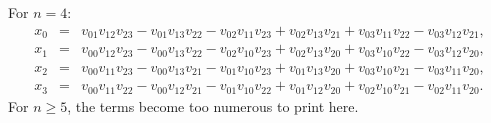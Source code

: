 \documentclass[12pt]{article}
\begin{document}
For $n = 4$:
\begin{eqnarray}
x_{0} &=& 
   v_{01} v_{12} v_{23}
 - v_{01} v_{13} v_{22}
 - v_{02} v_{11} v_{23}
 + v_{02} v_{13} v_{21}
 + v_{03} v_{11} v_{22}
 - v_{03} v_{12} v_{21},\\
x_{1} &=& 
    v_{00} v_{12} v_{23}
  - v_{00} v_{13} v_{22}
 - v_{02} v_{10} v_{23}
 + v_{02} v_{13} v_{20}
  + v_{03} v_{10} v_{22}
  - v_{03} v_{12} v_{20},\\
x_{2} &=& 
v_{00} v_{11} v_{23}
- v_{00} v_{13} v_{21}
  - v_{01} v_{10} v_{23}
  + v_{01} v_{13} v_{20}
  + v_{03} v_{10} v_{21}
  - v_{03} v_{11} v_{20},\\
x_{3} &=& 
   v_{00} v_{11} v_{22}
 - v_{00} v_{12} v_{21}
 - v_{01} v_{10} v_{22}
 + v_{01} v_{12} v_{20}
 + v_{02} v_{10} v_{21}
 - v_{02} v_{11} v_{20}.
\end{eqnarray}
For $n \ge 5$, the terms become too numerous to print here.


















\end{document}
